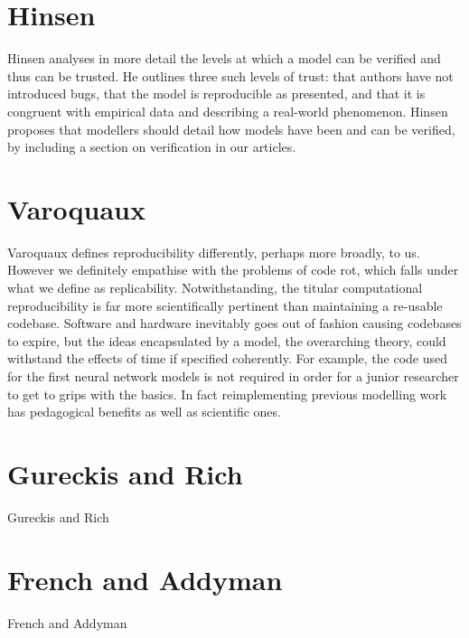 \documentclass[jou]{apa6}
\begin{document}
\section{Hinsen}
Hinsen analyses in more detail the levels at which a model can be verified and thus can be trusted. He outlines three such levels of trust: that authors have not introduced bugs, that the model is reproducible as presented, and that it is congruent with empirical data and describing a real-world phenomenon. Hinsen proposes that modellers should detail how models have been and can be verified, by including a section on verification in our articles.

\section{Varoquaux}
Varoquaux defines reproducibility differently, perhaps more broadly, to us. However we definitely empathise with the problems of code rot, which falls under what we define as replicability. Notwithstanding, the titular computational reproducibility is far more scientifically pertinent than maintaining a re-usable codebase. Software and hardware inevitably goes out of fashion causing codebases to expire, but the ideas encapsulated by a model, the overarching theory, could withstand the effects of time if specified coherently. For example, the code used for the first neural network models is not required in order for a junior researcher to get to grips with the basics. In fact reimplementing previous modelling work has pedagogical benefits as well as scientific ones.

\section{Gureckis and Rich}
Gureckis and Rich 

\section{French and Addyman}
French and Addyman




\hspace*{1cm}
\end{document}
